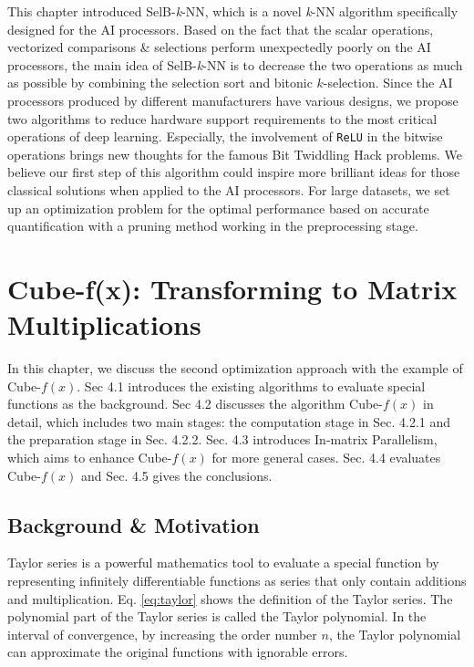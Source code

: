 \documentclass[12pt]{extbook}
\begin{document}
This chapter introduced SelB-\textit{k}-NN, which is a novel \textit{k}-NN algorithm specifically designed for the AI processors. Based on the fact that the scalar operations, vectorized comparisons \& selections perform unexpectedly poorly on the AI processors, the main idea of SelB-\textit{k}-NN is to decrease the two operations as much as possible by combining the selection sort and bitonic $k$-selection. Since the AI processors produced by different manufacturers have various designs, we propose two algorithms to reduce hardware support requirements to the most critical operations of deep learning. Especially, the involvement of \verb|ReLU| in the bitwise operations brings new thoughts for the famous Bit Twiddling Hack problems. We believe our first step of this algorithm could inspire more brilliant ideas for those classical solutions when applied to the AI processors. For large datasets, we set up an optimization problem for the optimal performance based on accurate quantification with a pruning method working in the preprocessing stage.



\chapter{Cube-f(x): Transforming to Matrix Multiplications}
\label{sec_4}

In this chapter, we discuss the second optimization approach with the example of Cube-$f(x)$. Sec 4.1 introduces the existing algorithms to evaluate special functions as the background. Sec 4.2 discusses the algorithm Cube-$f(x)$ in detail, which includes two main stages: the computation stage in Sec. 4.2.1 and the preparation stage in Sec. 4.2.2. Sec. 4.3 introduces In-matrix Parallelism, which aims to enhance Cube-$f(x)$ for more general cases. Sec. 4.4 evaluates Cube-$f(x)$ and Sec. 4.5 gives the conclusions.

\section{Background \& Motivation \label{sec:2}}

Taylor series is a powerful mathematics tool to evaluate a special function by representing infinitely differentiable functions as series that only contain additions and multiplication. Eq. \ref{eq:taylor} shows the definition of the Taylor series. The polynomial part of the Taylor series is called the Taylor polynomial. In the interval of convergence, by increasing the order number $n$, the Taylor polynomial can approximate the original functions with ignorable errors.
\end{document}
